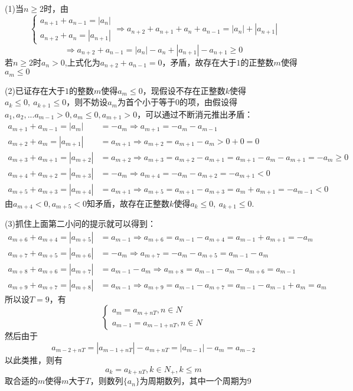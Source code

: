 \begin{solution}
    (1)当$n\ge 2$时，由\[
    \begin{cases}a_{n+1}+a_{n-1}=|a_n|\\a_{n+2}+a_{n}=|a_{n+1}|\end{cases}\Rightarrow a_{n+2}+a_{n+1}+a_n+a_{n-1}=|a_n|+|a_{n+1}|
    \]\[
    \Rightarrow a_{n+2}+a_{n-1}=|a_n|-a_n+|a_{n+1}|-a_{n+1}\ge 0
    \]
    若$n\ge 2$时$a_n>0$,上式化为$a_{n+2}+a_{n-1}=0$，矛盾，故存在大于$1$的正整数$m$使得$a_m\le 0$
 
    \noindent(2)已证存在大于$1$的整数$m$使得$a_m\le 0$，现假设不存在正整数$k$使得$a_k\le 0,~a_{k+1}\le 0$，则不妨设$a_m$为首个小于等于$0$的项，由假设得$a_1,a_2,...a_{m-1}>0,a_m\le 0, a_{m+1}>0$，可以通过不断消元推出矛盾：\vspace{-10pt}
    \begin{align*}
    a_{m+1}+a_{m-1}=|a_m|&=-a_m\Rightarrow a_{m+1}=-a_m-a_{m-1}\\
    a_{m+2}+a_m=|a_{m+1}|&=a_{m+1}\Rightarrow a_{m+2}=a_{m+1}-a_m>0+0=0\\
    a_{m+3}+a_{m+1}=|a_{m+2}|&=a_{m+2}\Rightarrow a_{m+3}=a_{m+2}-a_{m+1}=a_{m+1}-a_m-a_{m+1}=-a_m\geq 0\\
    a_{m+4}+a_{m+2}=|a_{m+3}|&=-a_{m}\Rightarrow a_{m+4}=-a_{m}-a_{m+2}=-a_{m+1}<0\\
    a_{m+5}+a_{m+3}=|a_{m+4}|&=a_{m+1}\Rightarrow a_{m+5}=a_{m+1}-a_{m+3}=a_m+a_{m+1}=-a_{m-1}<0
    \end{align*}
    由$a_{m+4}<0,a_{m+5}<0$知矛盾，故存在正整数$k$使得$a_k\le 0,~a_{k+1}\le 0$.

\noindent(3)抓住上面第二小问的提示就可以得到：
    \vspace{-5pt}\begin{align*}
    a_{m+6}+a_{m+4}=|a_{m+5}|&=a_{m-1}\Rightarrow a_{m+6}=a_{m-1}-a_{m+4}=a_{m-1}+a_{m+1}=-a_m\\
    a_{m+7}+a_{m+5}=|a_{m+6}|&=-a_{m}\Rightarrow a_{m+7}=-a_{m}-a_{m+5}=a_{m-1}-a_m\\
    a_{m+8}+a_{m+6}=|a_{m+7}|&=a_{m-1}-a_m\Rightarrow a_{m+8}=a_{m-1}-a_m-a_{m+6}=a_{m-1}\\
    a_{m+9}+a_{m+7}=|a_{m+8}|&=a_{m-1}\Rightarrow a_{m+9}=a_{m-1}-a_{m+7}=a_{m-1}-a_{m-1}+a_{m}=a_m
    \end{align*}\vspace{-15pt}
    所以设$T=9$，有\[\begin{cases}a_{m}=a_{m+nT},n\in N\\a_{m-1}=a_{m-1+nT},n\in N\end{cases}\]
    然后由于\[a_{m-2+nT}=|a_{m-1+nT}|-a_{m+nT}=|a_{m-1}|-a_{m}=a_{m-2}\]以此类推，则有\[
    a_k=a_{k+nT},k\in N_+,k\leq m\]取合适的$m$使得$m$大于$T$，则数列$\{a_n\}$为周期数列，其中一个周期为9
\end{solution}

